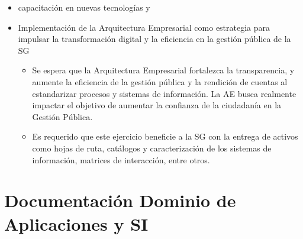 \documentclass[
	a4paper, %
	12pt, %
]{include/CSSullivanBusinessReport}
\def\tightlist{}
\begin{document}
\begin{itemize}
  \begin{itemize}
  \tightlist
  \item
    Se busca la consolidación de herramientas, canales e información
    para fortalecer la oferta y celeridad de servicios y la
    participación ciudadana. Esto incluye el seguimiento a canales de
    atención virtual como SuperCADE Virtual, chat, chat-Bot y (video)
    llamadas de la línea 195.
  \item
    Se busca optimizar los procesos de recolección, análisis y
    divulgación de la información mediante la implementación de sistemas
    de información que incluyan la automatización de la recolección de
    datos y el uso de herramientas analíticas.
  \item
    Es destacado que el Distrito unifica en el portal Bogotá su oferta
    de trámites y servicios, como el realizar pagos en línea (no
    tributarios) y agendamiento de citas en la RedCADE desde casa;
    esfuerzo que debe continuar y extenderse a los más de 1.400 trámites
    y servicios. Esto representa una mejora significativa en la
    accesibilidad y eficiencia de los servicios digitales para la
    ciudadanía.
  \end{itemize}
\item
  capacitación en nuevas tecnologías y
\item
  Implementación de la Arquitectura Empresarial como estrategia para
  impulsar la transformación digital y la eficiencia en la gestión
  pública de la SG

  \begin{itemize}
  \tightlist
  \item
    Se espera que la Arquitectura Empresarial fortalezca la
    transparencia, y aumente la eficiencia de la gestión pública y la
    rendición de cuentas al estandarizar procesos y sistemas de
    información. La AE busca realmente impactar el objetivo de aumentar
    la confianza de la ciudadanía en la Gestión Pública.
  \item
    Es requerido que este ejercicio beneficie a la SG con la entrega de
    activos como hojas de ruta, catálogos y caracterización de los
    sistemas de información, matrices de interacción, entre otros.
  \end{itemize}
\end{itemize}

\newpage

\section{Documentación Dominio de Aplicaciones y
SI}\label{sec:documentaciuxf3n-dominio-de-aplicaciones-y-si}
\end{document}
